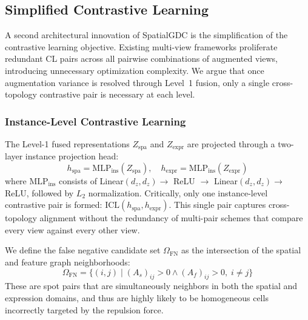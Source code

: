 \documentclass[lettersize,journal]{IEEEtran}
\begin{document}
\subsection{Simplified Contrastive Learning}
\label{sec:contrastive}

A second architectural innovation of SpatialGDC is the simplification of the contrastive learning objective. Existing multi-view frameworks proliferate redundant CL pairs across all pairwise combinations of augmented views, introducing unnecessary optimization complexity. We argue that once augmentation variance is resolved through Level~1 fusion, only a single cross-topology contrastive pair is necessary at each level.

\subsubsection{Instance-Level Contrastive Learning}
The Level-1 fused representations $Z_{\text{spa}}$ and $Z_{\text{expr}}$ are projected through a two-layer instance projection head:
\begin{equation}
    h_{\text{spa}} = \text{MLP}_{\text{ins}}(Z_{\text{spa}}), \quad h_{\text{expr}} = \text{MLP}_{\text{ins}}(Z_{\text{expr}})
\end{equation}
where $\text{MLP}_{\text{ins}}$ consists of Linear$(d_z, d_z) \to$ ReLU $\to$ Linear$(d_z, d_z) \to$ ReLU, followed by $L_2$ normalization. Critically, only one instance-level contrastive pair is formed: $\text{ICL}(h_{\text{spa}}, h_{\text{expr}})$. This single pair captures cross-topology alignment without the redundancy of multi-pair schemes that compare every view against every other view.

We define the false negative candidate set $\Omega_{\text{FN}}$ as the intersection of the spatial and feature graph neighborhoods:
\begin{equation}
    \Omega_{\text{FN}} = \{ (i, j) \mid (A_s)_{ij} > 0 \land (A_f)_{ij} > 0, \; i \neq j \}
\end{equation}
These are spot pairs that are simultaneously neighbors in both the spatial and expression domains, and thus are highly likely to be homogeneous cells incorrectly targeted by the repulsion force.
\end{document}
